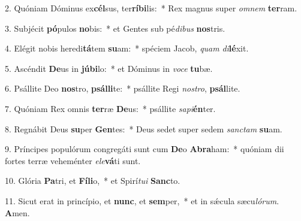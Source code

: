 2. Quóniam Dóminus ex\textbf{cél}sus, ter\textbf{rí}\textbf{bi}lis:~*  Rex magnus super \textit{om}\textit{nem} \textbf{ter}ram.\

3. Subjécit \textbf{pó}pulos \textbf{no}bis:~*  et Gentes sub pé\textit{di}\textit{bus} \textbf{nos}tris.\

4. Elégit nobis heredi\textbf{tá}tem \textbf{su}am:~*  spéciem Jacob, \textit{quam} \textit{di}\textbf{lé}xit.\

5. Ascéndit \textbf{De}us in \textbf{jú}\textbf{bi}lo:~*  et Dóminus in \textit{vo}\textit{ce} \textbf{tu}bæ.\

6. Psállite Deo \textbf{nos}tro, \textbf{psál}\textbf{li}te:~*  psállite Regi \textit{nos}\textit{tro}, \textbf{psál}lite.\

7. Quóniam Rex omnis \textbf{ter}ræ \textbf{De}us:~*  psállite \textit{sa}\textit{pi}\textbf{én}ter.\

8. Regnábit Deus \textbf{su}per \textbf{Gen}tes:~*  Deus sedet super sedem \textit{sanc}\textit{tam} \textbf{su}am.\

9. Príncipes populórum congregáti sunt cum \textbf{De}o \textbf{A}\textbf{bra}ham:~*  quóniam dii fortes terræ veheménter \textit{e}\textit{le}\textbf{vá}ti sunt.\

10. Glória \textbf{Pa}tri, et \textbf{Fí}\textbf{li}o,~*  et Spirí\textit{tu}\textit{i} \textbf{Sanc}to.\

11. Sicut erat in princípio, et \textbf{nunc}, et \textbf{sem}per,~*  et in sǽcula sæcu\textit{ló}\textit{rum}. \textbf{A}men.\

